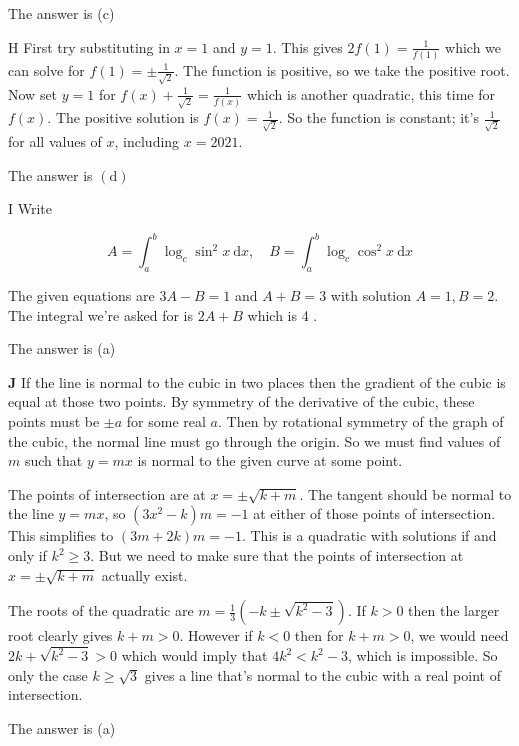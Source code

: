 \documentclass[10pt]{article}
\begin{document}
The answer is (c)

H First try substituting in $x=1$ and $y=1$. This gives $2 f(1)=\frac{1}{f(1)}$ which we can solve for $f(1)= \pm \frac{1}{\sqrt{2}}$. The function is positive, so we take the positive root. Now set $y=1$ for $f(x)+\frac{1}{\sqrt{2}}=\frac{1}{f(x)}$ which is another quadratic, this time for $f(x)$. The positive solution is $f(x)=\frac{1}{\sqrt{2}}$. So the function is constant; it's $\frac{1}{\sqrt{2}}$ for all values of $x$, including $x=2021$.

The answer is $(\mathrm{d})$

I Write

$$
A=\int_{a}^{b} \log _{c} \sin ^{2} x \mathrm{~d} x, \quad B=\int_{a}^{b} \log _{c} \cos ^{2} x \mathrm{~d} x
$$

The given equations are $3 A-B=1$ and $A+B=3$ with solution $A=1, B=2$. The integral we're asked for is $2 A+B$ which is 4 .

The answer is (a)

$\mathbf{J}$ If the line is normal to the cubic in two places then the gradient of the cubic is equal at those two points. By symmetry of the derivative of the cubic, these points must be $\pm a$ for some real $a$. Then by rotational symmetry of the graph of the cubic, the normal line must go through the origin. So we must find values of $m$ such that $y=m x$ is normal to the given curve at some point.

The points of intersection are at $x= \pm \sqrt{k+m}$. The tangent should be normal to the line $y=m x$, so $\left(3 x^{2}-k\right) m=-1$ at either of those points of intersection. This simplifies to $(3 m+2 k) m=-1$. This is a quadratic with solutions if and only if $k^{2} \geq 3$. But we need to make sure that the points of intersection at $x= \pm \sqrt{k+m}$ actually exist.

The roots of the quadratic are $m=\frac{1}{3}\left(-k \pm \sqrt{k^{2}-3}\right)$. If $k>0$ then the larger root clearly gives $k+m>0$. However if $k<0$ then for $k+m>0$, we would need $2 k+\sqrt{k^{2}-3}>0$ which would imply that $4 k^{2}<k^{2}-3$, which is impossible. So only the case $k \geq \sqrt{3}$ gives a line that's normal to the cubic with a real point of intersection.

The answer is (a)
\end{document}
